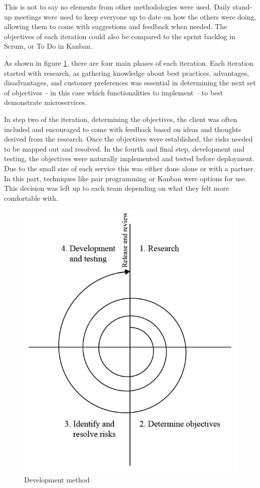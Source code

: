 This is not to say no elements from other methodologies were used. Daily stand-up meetings were used to keep everyone up to date on how the others were doing, allowing them to come with suggestions and feedback when needed. The objectives of each iteration could also be compared to the sprint backlog in Scrum, or To Do in Kanban. 


As shown in figure \ref{devMeth}, there are four main phases of each iteration. Each iteration started with research, as gathering knowledge about best practices, advantages, disadvantages, and customer preferences was essential in determining the next set of objectives -- in this case which functionalities to implement -- to best demonstrate microservices.

In step two of the iteration, determining the objectives, the client was often included and encouraged to come with feedback based on ideas and thoughts derived from the research. Once the objectives were established, the risks needed to be mapped out and resolved. In the fourth and final step, development and testing, the objectives were naturally implemented and tested before deployment. Due to the small size of each service this was either done alone or with a partner. In this part, techniques like pair programming or Kanban were options for use. This decision was left up to each team depending on what they felt more comfortable with. 


\begin{figure}[H]
    \centering
     \includegraphics[scale=0.6]{fig/project_management/devMeth}
    \caption{Development method}
    \label{devMeth}
\end{figure}


